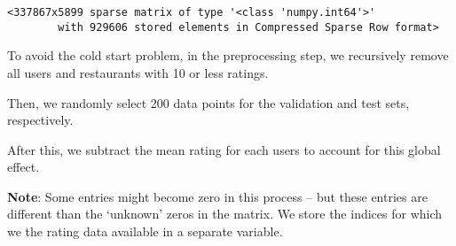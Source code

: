 \documentclass[11pt]{article}
\newcommand{\prompt}[4]{
        \llap{{\color{#2}[#3]: #4}}\vspace{-1.25em}
    }
\begin{document}
            \begin{tcolorbox}[breakable, boxrule=.5pt, size=fbox, pad at break*=1mm, opacityfill=0]
\prompt{Out}{outcolor}{23}{\hspace{3.5pt}}
\begin{Verbatim}[commandchars=\\\{\}]
<337867x5899 sparse matrix of type '<class 'numpy.int64'>'
        with 929606 stored elements in Compressed Sparse Row format>
\end{Verbatim}
\end{tcolorbox}
        
    To avoid the cold start problem, in the preprocessing step, we
recursively remove all users and restaurants with 10 or less ratings.

Then, we randomly select 200 data points for the validation and test
sets, respectively.

After this, we subtract the mean rating for each users to account for
this global effect.

\textbf{Note}: Some entries might become zero in this process -- but
these entries are different than the `unknown' zeros in the matrix. We
store the indices for which we the rating data available in a separate
variable.
\end{document}
